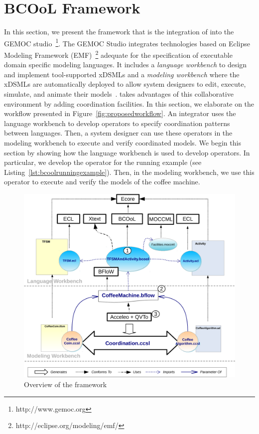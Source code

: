 \section{BCOoL Framework}
\label{section:bcoollengbench}
In this section, we present the \bcool framework that is the integration of \bcool into the GEMOC studio~\footnote{http://www.gemoc.org}. The GEMOC Studio integrates technologies based on Eclipse Modeling Framework (EMF)~\footnote{http://eclipse.org/modeling/emf/} adequate for the specification of executable domain specific modeling languages. It includes a \emph{language workbench} to design and implement tool-supported xDSMLs and a \emph{modeling workbench} where the xDSMLs are automatically deployed to allow system designers to edit, execute, simulate, and animate their models~\cite{ttc15bib}. \bcool takes advantages of this collaborative environment by adding coordination facilities. In this section, we elaborate on the workflow presented in Figure~\ref{fig:proposedworkflow}. An integrator uses the language workbench to develop \bcool operators to specify coordination patterns between languages. Then, a system designer can use these operators in the modeling workbench to execute and verify coordinated models. We begin this section by showing how the language workbench is used to develop \bcool operators. In particular, we develop the operator for the running example (see Listing~\ref{lst:bcoolrunningexample}). Then, in the modeling workbench, we use this operator to execute and verify the models of the coffee machine. 
\begin{figure}[h]
	\begin{center}
		\includegraphics[width=1\textwidth]{bcool/figs/bcooltechnos}
		\caption{Overview of the \bcool framework}
		\label{fig:bcooltechnos}
	\end{center}
\end{figure}

